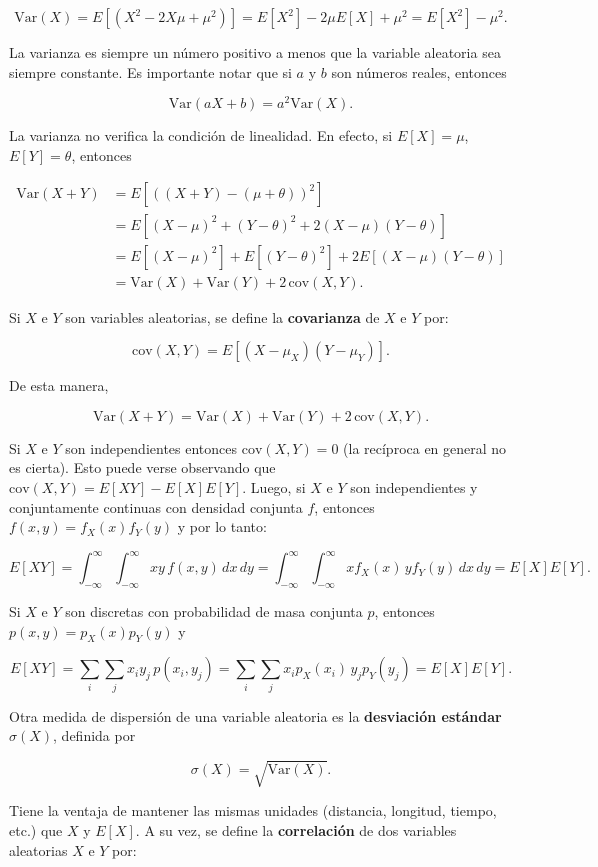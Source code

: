 \documentclass[11pt, a4paper]{article}
\theoremstyle{definition}
\begin{document}
\[\text{Var}(X) = E[(X^2 - 2X\mu + \mu^2)] = E[X^2] - 2\mu E[X] + \mu^2 = E[X^2] - \mu^2.\]

La varianza es siempre un número positivo a menos que la variable aleatoria sea siempre constante. Es importante notar que si \(a\) y \(b\) son números reales, entonces

\[\text{Var}(aX+b)=a^{2}\text{Var}(X).\]

La varianza no verifica la condición de linealidad. En efecto, si \(E[X]=\mu\), \(E[Y]=\theta\), entonces

\begin{align*}
\text{Var}(X+Y) &= E[((X+Y)-(\mu+\theta))^{2}] \\
&= E[(X-\mu)^{2}+(Y-\theta)^{2}+2(X-\mu)(Y-\theta)] \\
&= E[(X-\mu)^{2}] + E[(Y-\theta)^{2}] + 2E[(X-\mu)(Y-\theta)] \\
&= \text{Var}(X) + \text{Var}(Y) + 2\,\text{cov}(X,Y).
\end{align*}

Si \(X\) e \(Y\) son variables aleatorias, se define la \textbf{covarianza} de \(X\) e \(Y\) por:

\[\text{cov}(X,Y)=E[(X-\mu_{X})(Y-\mu_{Y})].\]

De esta manera,

\[\text{Var}(X+Y)=\text{Var}(X)+\text{Var}(Y)+2\,\text{cov}(X,Y).\]

Si \(X\) e \(Y\) son independientes entonces \(\text{cov}(X,Y)=0\) (la recíproca en general no es cierta). Esto puede verse observando que \(\text{cov}(X,Y)=E[XY]-E[X]E[Y]\). Luego, si \(X\) e \(Y\) son independientes y conjuntamente continuas con densidad conjunta \(f\), entonces \(f(x,y)=f_{X}(x)f_{Y}(y)\) y por lo tanto:

\[E[XY]=\int_{-\infty}^{\infty}\int_{-\infty}^{\infty}xy\,f(x,y)\,dx\,dy=\int_{-\infty}^{\infty}\int_{-\infty}^{\infty}xf_{X}(x)\,yf_{Y}(y)\,dx\,dy=E[X]E[Y].\]

Si \(X\) e \(Y\) son discretas con probabilidad de masa conjunta \(p\), entonces \(p(x,y)=p_{X}(x)p_{Y}(y)\) y

\[E[XY]=\sum_{i}\sum_{j}x_{i}y_{j}\,p(x_{i},y_{j})=\sum_{i}\sum_{j}x_{i}p_{X}(x_{i})\,y_{j}p_{Y}(y_{j})=E[X]E[Y].\]

Otra medida de dispersión de una variable aleatoria es la \textbf{desviación estándar} \(\sigma(X)\), definida por

\[\sigma(X)=\sqrt{\text{Var}(X)}.\]

Tiene la ventaja de mantener las mismas unidades (distancia, longitud, tiempo, etc.) que \(X\) y \(E[X]\). A su vez, se define la \textbf{correlación} de dos variables aleatorias \(X\) e \(Y\) por:
\end{document}
